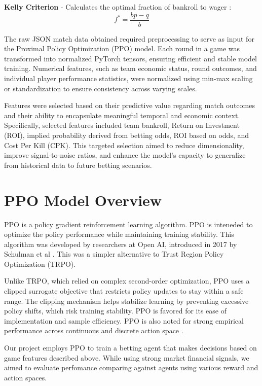 \documentclass[sigconf]{acmart}
\begin{document}
\textbf{Kelly Criterion} - Calculates the optimal fraction of bankroll to wager \cite{kelly1956new} :
\begin{equation}
f^* = \frac{bp - q}{b}
\end{equation}

\bigskip

The raw JSON match data obtained required preprocessing to serve as input for the Proximal Policy Optimization (PPO) model. Each round in a game was transformed into normalized PyTorch tensors, ensuring efficient and stable model training. Numerical features, such as team economic status, round outcomes, and individual player performance statistics, were normalized using min-max scaling or standardization to ensure consistency across varying scales.

Features were selected based on their predictive value regarding match outcomes and their ability to encapsulate meaningful temporal and economic context. Specifically, selected features included team bankroll, Return on Investment (ROI), implied probability derived from betting odds, ROI based on odds, and Cost Per Kill (CPK). This targeted selection aimed to reduce dimensionality, improve signal-to-noise ratios, and enhance the model's capacity to generalize from historical data to future betting scenarios.

\section{PPO Model Overview}

PPO is a policy gradient reinforcement learning algorithm. PPO is inteneded to optimize the policy performance while maintaining training stability. This algorithm was developed by researchers at Open AI, introduced in 2017 by Schulman et al \cite{schulman2017proximalpolicyoptimizationalgorithms}. This was a simpler alternative to Trust Region Policy Optimization (TRPO).

Unlike TRPO, which relied on complex second-order optimization, PPO uses a clipped surrogate objective that restricts policy updates to stay within a safe range. The clipping mechanism helps stabilize learning by preventing excessive policy shifts, which risk training stability. PPO is favored for its ease of implementation and sample efficiency. PPO is also noted for strong empirical performance across continuous and discrete action space \cite{schulman2017proximalpolicyoptimizationalgorithms}.

Our project employs PPO to train a betting agent that makes decisions based on game features described above. While using strong market financial signals, we aimed to evaluate perfomance comparing against agents using various reward and action spaces.
\end{document}
